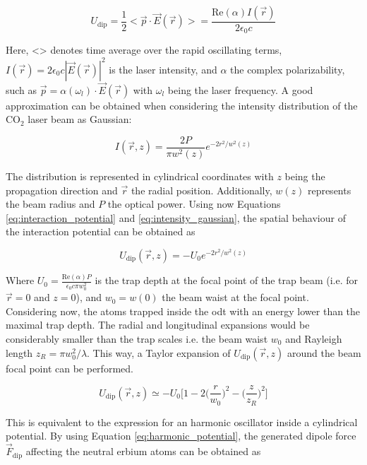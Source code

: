 \begin{equation}\label{eq:interaction_potential}
	U_{\text{dip}} = \frac{1}{2} <\vec{p} \cdot \vec{E}(\vec{r})>=\frac{\text{Re}(\alpha) I(\vec{r})}{2 \epsilon_0 c} 
\end{equation}

Here, <> denotes time average over the rapid oscillating terms, $I(\vec{r}) = 2 \epsilon_0 c |\vec{E}(\vec{r})|^2$ is the laser intensity, and $\alpha$ the complex polarizability, such as $\vec{p} = \alpha(\omega_l) \cdot \vec{E}(\vec{r})$ with $\omega_l$ being the laser frequency. A good approximation can be obtained when considering the intensity distribution of the $\text{CO}_2$ laser beam as Gaussian:

\begin{equation}\label{eq:intensity_gaussian}
	I(\vec{r}, z) = \frac{2P}{\pi w^2(z)} e^{-2r^2/w^2(z)}
\end{equation}

The distribution is represented in cylindrical coordinates with $z$ being the propagation direction and $\vec{r}$ the radial position. Additionally, $w(z)$ represents the beam radius and $P$ the optical power. Using now Equations \eqref{eq:interaction_potential} and \eqref{eq:intensity_gaussian}, the spatial behaviour of the interaction potential can be obtained as

\begin{equation}
	U_{\text{dip}}(\vec{r}, z) =  -U_0 e^{-2r^2/w^2(z)}
\end{equation}

Where $U_0 = \frac{\text{Re}(\alpha) P}{\epsilon_0 c \pi w_0^2}$ is the trap depth at the focal point of the trap beam (i.e. for $\vec{r} = 0$ and $z=0$), and $w_0=w(0)$ the beam waist at the focal point. Considering now, the atoms trapped inside the \ac{odt} with an energy lower than the maximal trap depth. The radial and longitudinal expansions would be considerably smaller than the trap scales i.e. the beam waist $w_0$ and Rayleigh length $z_R = \pi w_0^2/ \lambda$. This way, a Taylor expansion of $U_{\text{dip}}(\vec{r}, z)$  around the beam focal point can be performed. 


\begin{equation}\label{eq:harmonic_potential}
	U_{\text{dip}}(\vec{r}, z) \simeq  -U_0 \bigg[1-2\bigg(\frac{r}{w_0}\bigg)^2-\bigg(\frac{z}{z_R}\bigg)^2\bigg]
\end{equation}

This is equivalent to the expression for an harmonic oscillator inside a cylindrical potential. By using Equation \eqref{eq:harmonic_potential}, the generated dipole force $\vec{F}_{\text{dip}}$ affecting the neutral erbium atoms can be obtained as

